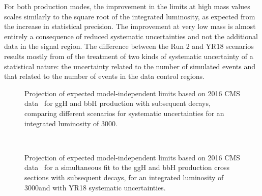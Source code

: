 For both production modes, 
the improvement in the limits at high mass values
scales similarly to the square root of the integrated luminosity,
as expected from the increase in statistical precision.
The improvement at very low mass is almost entirely a consequence of reduced systematic uncertainties
and not the additional data in the signal region. 
The difference between the Run 2 and YR18 scenarios results mostly from of the treatment 
of two kinds of systematic uncertainty of a statistical nature: 
the uncertainty related to the number of simulated events 
and that related to the number 
of events in the data control regions.
%
\begin{figure}[htbp]
\begin{center}
\end{center}
\caption{Projection of expected model-independent limits based on 2016 CMS data~\cite{HIG-17-020} 
for ggH and bbH production with subsequent \htt decays, comparing different 
scenarios for systematic uncertainties for an integrated luminosity of 3000\fbinv.}
\label{fig:model_indep2}
\end{figure}

\begin{figure}[htbp]
\begin{center}
\\
\end{center}
\caption{Projection of expected model-independent limits based on 2016 CMS data~\cite{HIG-17-020} for a simultaneous fit to the ggH and bbH production cross sections with subsequent \htt decays, 
for an integrated luminosity of 3000\fbinv and with YR18 systematic uncertainties.}
\label{fig:model_indep2d}
\end{figure}